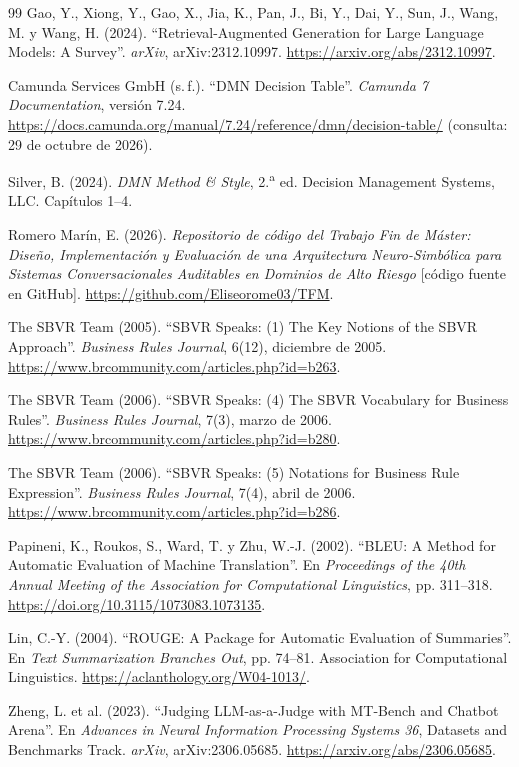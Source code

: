 \begin{thebibliography}{99}
Gao, Y., Xiong, Y., Gao, X., Jia, K., Pan, J., Bi, Y., Dai, Y., Sun, J., Wang, M. y Wang, H. (2024).
``Retrieval-Augmented Generation for Large Language Models: A Survey''.
\textit{arXiv}, arXiv:2312.10997.
\url{https://arxiv.org/abs/2312.10997}.

Camunda Services GmbH (s.\,f.).
``DMN Decision Table''.
\textit{Camunda 7 Documentation}, versión 7.24.
\url{https://docs.camunda.org/manual/7.24/reference/dmn/decision-table/} (consulta: 29 de octubre de 2026).

Silver, B. (2024).
\textit{DMN Method \& Style}, 2.\textsuperscript{a} ed.
Decision Management Systems, LLC. Capítulos 1--4.

Romero Marín, E. (2026).
\textit{Repositorio de código del Trabajo Fin de Máster: Diseño, Implementación y Evaluación de una Arquitectura Neuro-Simbólica para Sistemas Conversacionales Auditables en Dominios de Alto Riesgo} [código fuente en GitHub].
\url{https://github.com/Eliseorome03/TFM}.

The SBVR Team (2005).
``SBVR Speaks: (1) The Key Notions of the SBVR Approach''.
\textit{Business Rules Journal}, 6(12), diciembre de 2005.
\url{https://www.brcommunity.com/articles.php?id=b263}.

The SBVR Team (2006).
``SBVR Speaks: (4) The SBVR Vocabulary for Business Rules''.
\textit{Business Rules Journal}, 7(3), marzo de 2006.
\url{https://www.brcommunity.com/articles.php?id=b280}.

The SBVR Team (2006).
``SBVR Speaks: (5) Notations for Business Rule Expression''.
\textit{Business Rules Journal}, 7(4), abril de 2006.
\url{https://www.brcommunity.com/articles.php?id=b286}.

Papineni, K., Roukos, S., Ward, T. y Zhu, W.-J. (2002).
``BLEU: A Method for Automatic Evaluation of Machine Translation''.
En \textit{Proceedings of the 40th Annual Meeting of the Association for Computational Linguistics}, pp. 311--318.
\url{https://doi.org/10.3115/1073083.1073135}.

Lin, C.-Y. (2004).
``ROUGE: A Package for Automatic Evaluation of Summaries''.
En \textit{Text Summarization Branches Out}, pp. 74--81. Association for Computational Linguistics.
\url{https://aclanthology.org/W04-1013/}.

Zheng, L. et al. (2023).
``Judging LLM-as-a-Judge with MT-Bench and Chatbot Arena''.
En \textit{Advances in Neural Information Processing Systems 36}, Datasets and Benchmarks Track.
\textit{arXiv}, arXiv:2306.05685.
\url{https://arxiv.org/abs/2306.05685}.


\end{thebibliography}
